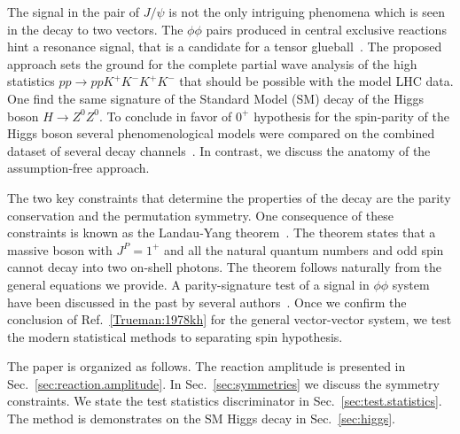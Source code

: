 \documentclass[prd,preprintnumbers,floatfix,
nofootinbib,superscriptaddress]{revtex4}
\begin{document}
The signal in the pair of $J/\psi$ is not the only intriguing phenomena which is seen in the decay to two vectors.
The $\phi\phi$ pairs produced in central exclusive reactions hint a resonance signal, that is a candidate for a tensor glueball~\cite{Lebiedowicz:2019jru}.
The proposed approach sets the ground for the complete partial wave analysis of the high statistics $pp\to pp K^+K^-K^+K^-$ that
should be possible with the model LHC data.
One find the same signature of the Standard Model (SM) decay of the Higgs boson $H\to Z^0Z^0$.
To conclude in favor of $0^+$ hypothesis for the spin-parity of the Higgs boson
several phenomenological models were compared on the combined dataset of several decay channels~\cite{Aad:2013xqa,CMS:2018mmw}.
In contrast, we discuss the anatomy of the assumption-free approach.

The two key constraints that determine the properties of the decay are the parity conservation and the permutation symmetry.
One consequence of these constraints is known as the Landau-Yang theorem~\cite{Yang:1950rg,Landau:1948kw}.
The theorem states that a massive boson with $J^P = 1^+$ and all the natural quantum numbers and odd spin cannot decay into two on-shell photons.
The theorem follows naturally from the general equations we provide.
A parity-signature test of a signal in $\phi\phi$ system have been discussed in the past by several authors~\cite{Trueman:1978kh,Chang:1978jb,Collins:1977iv}.
Once we confirm the conclusion of Ref.~\ref{Trueman:1978kh} for the general vector-vector system, we test the modern statistical methods to separating spin hypothesis.

The paper is organized as follows. The reaction amplitude is presented in Sec.~\ref{sec:reaction.amplitude}.
In Sec.~\ref{sec:symmetries} we discuss the symmetry constraints.
We state the test statistics discriminator in Sec.~\ref{sec:test.statistics}.
The method is demonstrates on the SM Higgs decay in Sec.~\ref{sec:higgs}.

\end{document}

